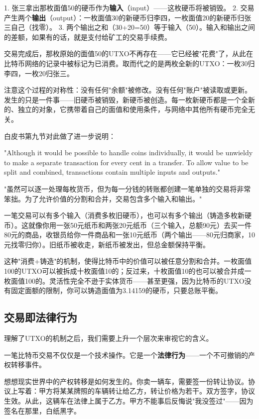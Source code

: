 \documentclass[a4paper,12pt,openany]{ctexbook}
\newenvironment{quoting}{%
  \par\vspace{0.5em}%
  \begin{list}{}{%
    \setlength{\leftmargin}{2em}%
    \setlength{\rightmargin}{2em}%
    \setlength{\parsep}{0.3em}%
    \setlength{\itemsep}{0pt}%
    \setlength{\topsep}{0pt}%
  }%
  \item\relax
}{%
  \end{list}%
  \par\vspace{0.5em}%
}
\begin{document}
1. 张三拿出那枚面值50的硬币作为\textbf{输入}（input）——这枚硬币将被销毁。
2. 交易产生两个\textbf{输出}（output）：一枚面值30的新硬币归李四，一枚面值20的新硬币归张三自己（找零）。
3. 两个输出之和（30+20=50）等于输入（50）。输入和输出之间的差额，如果有的话，就是支付给矿工的交易手续费。

交易完成后，那枚原始的面值50的UTXO不再存在——它已经被"花费"了，从此在比特币网络的记录中被标记为已消费。取而代之的是两枚全新的UTXO：一枚30归李四，一枚20归张三。

注意这个过程的对称性：没有任何"余额"被修改。没有任何"账户"被读取或更新。发生的只是一件事——旧硬币被销毁，新硬币被创造。每一枚新硬币都是一个全新的、独立的对象，它携带着自己的面值和使用条件，与网络中其他所有硬币完全无关。

白皮书第九节对此做了进一步说明：


\begin{quoting}
\small
"Although it would be possible to handle coins individually, it would be unwieldy to make a separate transaction for every cent in a transfer. To allow value to be split and combined, transactions contain multiple inputs and outputs."

"虽然可以逐一处理每枚货币，但为每一分钱的转账都创建一笔单独的交易将非常笨拙。为了允许价值的分割和合并，交易包含多个输入和输出。"
\end{quoting}


一笔交易可以有多个输入（消费多枚旧硬币），也可以有多个输出（铸造多枚新硬币）。这就像你用一张50元纸币和两张20元纸币（三个输入，总额90元）去买一件80元的商品，收银员给你一件商品和一张10元纸币（两个输出——80元归商家，10元找零归你）。旧纸币被收走，新纸币被发出，但总金额保持平衡。

这种"消费+铸造"的机制，使得比特币中的价值可以被任意分割和合并。一枚面值100的UTXO可以被拆成十枚面值10的；反过来，十枚面值10的也可以被合并成一枚面值100的。灵活性完全不逊于实体货币——甚至更强，因为比特币的UTXO没有固定面额的限制，你可以铸造面值为3.14159的硬币，只要总账平衡。


\subsection*{交易即法律行为}


理解了UTXO的机制之后，我们需要上升一个层次来审视它的含义。

一笔比特币交易不仅仅是一个技术操作。它是一个\textbf{法律行为}——一个不可撤销的产权转移事件。

想想现实世界中的产权转移是如何发生的。你卖一辆车，需要签一份转让协议。协议上写着：甲方将某某牌照的车辆转让给乙方，转让价格为若干。双方签字，协议生效。从此，这辆车在法律上属于乙方。甲方不能事后反悔说"我没签过"——因为签名在那里，白纸黑字。
\end{document}
